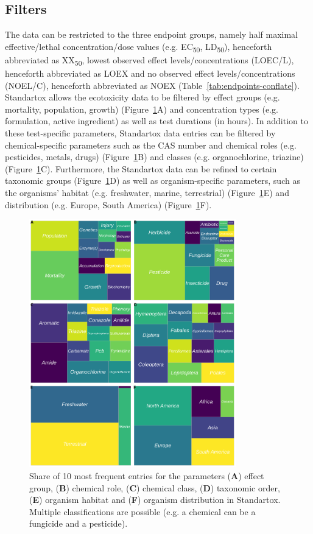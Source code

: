 \documentclass[journal,datadescriptor,accept,moreauthors,pdftex]{Definitions/mdpi}
\begin{document}
\subsection{Filters}
The data can be restricted to the three endpoint groups, namely half maximal effective/lethal concentration/dose values (e.g. EC\textsubscript{50}, LD\textsubscript{50}), henceforth abbreviated as XX\textsubscript{50}, lowest observed effect levels/concentrations (LOEC/L), henceforth abbreviated as LOEX and no observed effect levels/concentrations (NOEL/C), henceforth abbreviated as NOEX (Table~\ref{tab:endpoints-conflate}). Standartox allows the ecotoxicity data to be filtered by effect groups (e.g. mortality, population, growth) (Figure~\ref{fig:stx-parameters}A) and concentration types (e.g. formulation, active ingredient) as well as test durations (in hours). In addition to these test-specific parameters, Standartox data entries can be filtered by chemical-specific parameters such as the CAS number and chemical roles (e.g. pesticides, metals, drugs) (Figure~\ref{fig:stx-parameters}B) and classes (e.g. organochlorine, triazine) (Figure~\ref{fig:stx-parameters}C). Furthermore, the Standartox data can be refined to certain taxonomic groups (Figure~\ref{fig:stx-parameters}D) as well as organism-specific parameters, such as the organisms' habitat (e.g. freshwater, marine, terrestrial) (Figure~\ref{fig:stx-parameters}E) and distribution (e.g. Europe, South America) (Figure~\ref{fig:stx-parameters}F).

\begin{figure}[H]
    \centering
    \includegraphics[width=0.8\textwidth]{article/figures/standartox_parameters.png}
    \caption{Share of 10 most frequent entries for the parameters (\textbf{A}) effect group, (\textbf{B}) chemical role, (\textbf{C}) chemical class, (\textbf{D}) taxonomic order, (\textbf{E}) organism habitat and (\textbf{F}) organism distribution in Standartox. Multiple classifications are possible (e.g. a chemical can be a fungicide and a pesticide).}
    \label{fig:stx-parameters}
\end{figure}
\end{document}
